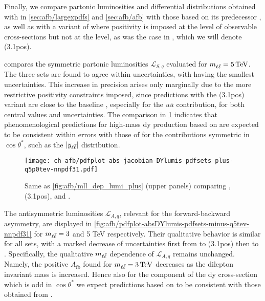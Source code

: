 
Finally, we compare partonic luminosities and \lhc differential distributions
obtained with  in \cref{sec:afb/largexpdfs} and \cref{sec:afb/afb}
with those based  on its predecessor , as well as with a variant of
 where positivity is imposed at the level of observable
cross-sections but not at the \pdf level, as was the case in  , which
we will denote (3.1pos).

 compares the 
symmetric partonic luminosities $\mathcal{L}_{S,q}$ evaluated for
$\mll=\SI{5}{\tera\electronvolt}$.
%
The three sets are found to agree within uncertainties,
with  having the smallest uncertainties.
%
This increase in precision arises only marginally due to the more restrictive
positivity constraints imposed, since predictions with the (3.1pos)
variant  are close to the baseline , especially  for the $u\bar{u}$
contribution, for both central values and uncertainties.
%
The comparison in \cref{fig:afb/pdfplot-absDYlumis-pdfsets-plus-q5tev-nnpdf31}
indicates that phenomenological predictions for high-mass \acrlong{dy}
production based on  are expected
to be consistent within errors with those of  for the contributions
symmetric in $\cos\theta^*$, such as the $|y_{\ell\bar{\ell}}|$ distribution.

\begin{figure}[!t]
 \centering
 \texttt{[image: ch-afb/pdfplot-abs-jacobian-DYlumis-pdfsets-plus-q5p0tev-nnpdf31.pdf]}
 \caption{Same as \cref{fig:afb/mll_dep_lumi_plus} (upper panels) comparing
, (3.1pos), and .
 }    
 \label{fig:afb/pdfplot-absDYlumis-pdfsets-plus-q5tev-nnpdf31}
\end{figure}

The antisymmetric luminosities $\mathcal{L}_{A,q}$, relevant for the
forward-backward asymmetry, are displayed in \cref{fig:afb/pdfplot-absDYlumis-pdfsets-minus-q5tev-nnpdf31}
for $m_{\ell\bar{\ell}} = 3$ and 5 TeV respectively.
%
Their qualitative behavior is similar for all  \pdf sets,
with a marked decrease of \pdf uncertainties first from 
to  (3.1pos)  then
to .
%
Specifically, the qualitative $m_{\ell\bar{\ell}}$ dependence
of $\mathcal{L}_{A,q}$ remains unchanged. Namely, the positive $A_{\text{fb}}$
found for $\mll= \SI{3}{\tera\electronvolt}$ decreases 
as the dilepton invariant mass is increased.
%
Hence also for the component of the \acrlong{dy} cross-section which is odd
in $\cos\theta^*$ we expect \lhc predictions based on  to be consistent
with those obtained from .

